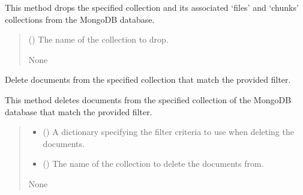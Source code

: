 \documentclass[letterpaper,10pt,english]{sphinxmanual}
\begin{document}
\begin{fulllineitems}
\begin{fulllineitems}
\sphinxAtStartPar
This method drops the specified collection and its associated ‘files’ and ‘chunks’ collections
from the MongoDB database.
\begin{quote}\begin{description}
\sphinxAtStartPar
{} () \textendash{} The name of the collection to drop.

\sphinxAtStartPar
None

\end{description}\end{quote}

\end{fulllineitems}


\begin{fulllineitems}
\label{\detokenize{forensicfit.database.database:forensicfit.database.database.Database.delete}}
\pysigstartsignatures
{}
\pysigstopsignatures
\sphinxAtStartPar
Delete documents from the specified collection that match the provided filter.

\sphinxAtStartPar
This method deletes documents from the specified collection of the MongoDB database
that match the provided filter.
\begin{quote}\begin{description}
\begin{itemize}
\item {} 
\sphinxAtStartPar
{} () \textendash{} A dictionary specifying the filter criteria to use when deleting the documents.

\item {} 
\sphinxAtStartPar
{} () \textendash{} The name of the collection to delete the documents from.

\end{itemize}

\sphinxAtStartPar
None


\end{description}
\end{quote}
\end{fulllineitems}
\end{fulllineitems}
\end{document}
